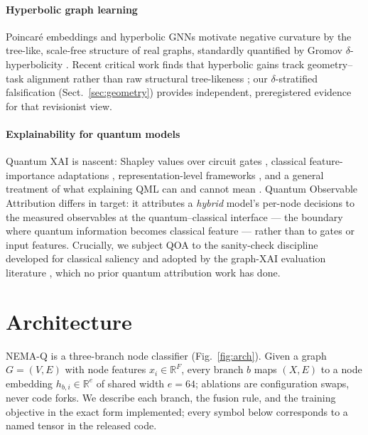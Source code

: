 \documentclass[pdflatex,sn-mathphys-num]{sn-jnl}
\begin{document}
\paragraph{Hyperbolic graph learning} Poincar\'e embeddings \cite{nickel2017poincare} and hyperbolic GNNs \cite{chami2019hgcn,liu2019hgnn,ganea2018hnn} motivate negative curvature by the tree-like, scale-free structure of real graphs, standardly quantified by Gromov $\delta$-hyperbolicity \cite{adcock2013tree,yang2022hgnnreview}. Recent critical work finds that hyperbolic gains track geometry--task alignment rather than raw structural tree-likeness \cite{alignment2026hyperbolic}; our $\delta$-stratified falsification (Sect.~\ref{sec:geometry}) provides independent, preregistered evidence for that revisionist view.

\paragraph{Explainability for quantum models} Quantum XAI is nascent: Shapley values over circuit gates \cite{heese2025shapley}, classical feature-importance adaptations \cite{qfi2024feature}, representation-level frameworks \cite{qrlaxai2025}, and a general treatment of what explaining QML can and cannot mean \cite{gilfuster2024explaining}. Quantum Observable Attribution differs in target: it attributes a \emph{hybrid} model's per-node decisions to the measured observables at the quantum--classical interface --- the boundary where quantum information becomes classical feature --- rather than to gates or input features. Crucially, we subject QOA to the sanity-check discipline developed for classical saliency \cite{adebayo2018sanity,hooker2019roar} and adopted by the graph-XAI evaluation literature \cite{agarwal2023graphxai,ginxeval2023,robustfidelity2023}, which no prior quantum attribution work has done.

\section{Architecture}\label{sec:arch}

NEMA-Q is a three-branch node classifier (Fig.~\ref{fig:arch}). Given a graph $G=(V,E)$ with node features $x_i \in \mathbb{R}^F$, every branch $b$ maps $(X, E)$ to a node embedding $h_{b,i} \in \mathbb{R}^{e}$ of shared width $e=64$; ablations are configuration swaps, never code forks. We describe each branch, the fusion rule, and the training objective in the exact form implemented; every symbol below corresponds to a named tensor in the released code.
\end{document}
